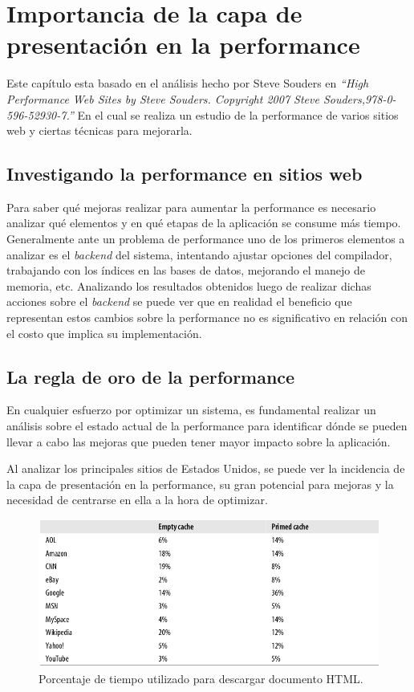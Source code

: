 \documentclass[a4paper,12pt]{report}
\begin{document}
\chapter{Importancia de la capa de presentación en la performance}

Este capítulo esta basado en el análisis hecho por Steve Souders en \emph{``High Performance Web Sites by Steve Souders. Copyright 2007 Steve Souders,978-0-596-52930-7.''}
En el cual se realiza un estudio de la performance de varios sitios web y ciertas técnicas para   mejorarla.

\section{Investigando la performance en sitios web}

Para saber qué mejoras realizar para aumentar la performance es necesario analizar qué elementos y en qué etapas de la aplicación se consume más tiempo.
Generalmente ante un problema de performance uno de los primeros elementos a analizar es el \emph{backend} del sistema, intentando ajustar opciones del compilador,
trabajando con los índices en las bases de datos, mejorando el manejo de memoria, etc.
Analizando los resultados obtenidos luego de realizar dichas acciones sobre el \emph{backend} se puede ver que en
realidad el beneficio que representan estos cambios sobre la performance no es significativo en relación con el costo que implica su implementación.

\section{La regla de oro de la performance}

En cualquier esfuerzo por optimizar un sistema, es fundamental realizar un análisis sobre el estado actual de la performance para identificar dónde se pueden llevar a cabo
las mejoras que pueden tener mayor impacto sobre la aplicación.

Al analizar los principales sitios de Estados Unidos, se puede ver la incidencia de la capa de presentación
en la performance, su gran potencial para mejoras y la necesidad de centrarse en ella a la hora de optimizar.

\begin{figure}[h]
\centering
\includegraphics[width=1\textwidth]{figuras/hpws/tiempos_top10.png}
	\caption{Porcentaje de tiempo utilizado para descargar documento HTML.}
    \label{fig.tiempos_top10}
\end{figure}
\end{document}
